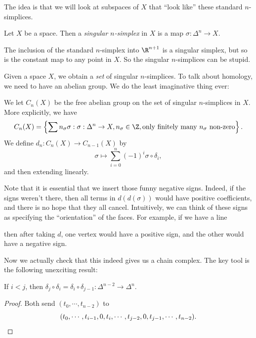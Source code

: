 \documentclass[a4paper]{article}
\theoremstyle{definition}
\begin{document}
The idea is that we will look at subspaces of $X$ that ``look like'' these standard $n$-simplices.
\begin{defi}
  Let $X$ be a space. Then a \emph{singular $n$-simplex} in $X$ is a map $\sigma: \Delta^n \to X$.
\end{defi}

\begin{eg}
  The inclusion of the standard $n$-simplex into $\R^{n+1}$ is a singular simplex, but so is the constant map to any point in $X$. So the singular $n$-simplices can be stupid.
\end{eg}

Given a space $X$, we obtain a \emph{set} of singular $n$-simplices. To talk about homology, we need to have an abelian group. We do the least imaginative thing ever:

\begin{defi}
  We let $C_n(X)$ be the free abelian group on the set of singular $n$-simplices in $X$. More explicitly, we have
  \[
    C_n(X) = \left\{\sum n_\sigma \sigma: \sigma: \Delta^n \to X, n_\sigma \in \Z, \text{only finitely many $n_\sigma$ non-zero}\right\}.
  \]
  We define $d_n: C_n(X) \to C_{n - 1}(X)$ by
  \[
    \sigma \mapsto \sum_{i = 0}^n (-1)^i \sigma \circ \delta_i,
  \]
  and then extending linearly.
\end{defi}
Note that it is essential that we insert those funny negative signs. Indeed, if the signs weren't there, then all terms in $d(d(\sigma))$ would have positive coefficients, and there is no hope that they all cancel. Intuitively, we can think of these signs as specifying the ``orientation'' of the faces. For example, if we have a line
\begin{center}
\end{center}
then after taking $d$, one vertex would have a positive sign, and the other would have a negative sign.

Now we actually check that this indeed gives us a chain complex. The key tool is the following unexciting result:
\begin{lemma}
  If $i < j$, then $\delta_j \circ \delta_i = \delta_i \circ \delta_{j - 1} : \Delta^{n - 2} \to \Delta^n$.
\end{lemma}

\begin{proof}
  Both send $(t_0, \cdots, t_{n - 2})$ to
  \[
    (t_0, \cdots, t_{i - 1}, 0, t_i, \cdots, t_{j - 2}, 0, t_{j - 1}, \cdots, t_{n - 2}).\qedhere
  \]
\end{proof}
\end{document}

